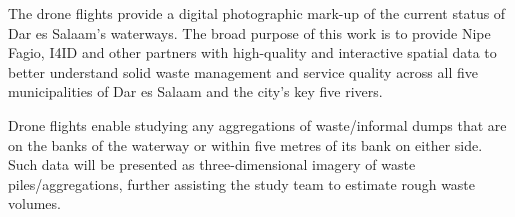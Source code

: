 \documentclass[a4paper,12pt,twoside]{article}
\begin{document}
\begin{multicols}{2}
The drone flights provide a digital photographic mark-up of the current status of Dar es Salaam’s waterways. The broad purpose of this work is to provide Nipe Fagio, I4ID and other partners with high-quality and interactive spatial data to better understand solid waste management and service quality across all five municipalities of Dar es Salaam and the city’s key five rivers.

Drone flights enable studying any aggregations of waste/informal dumps that are on the banks of the waterway or within five metres of its bank on either side. Such data will be presented as three-dimensional imagery of waste piles/aggregations, further assisting the study team to estimate rough waste volumes.

\end{multicols}

\end{document}
